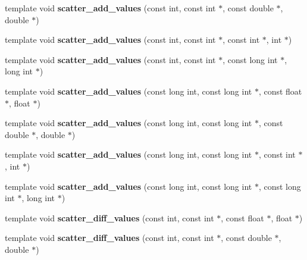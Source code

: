 \begin{DoxyCompactItemize}
\item 
\mbox{\label{namespaceschwz_a1a15b2c2b084f065b99bcae1bd055ca1}} 
template void {\bfseries scatter\+\_\+add\+\_\+values} (const int, const int $\ast$, const double $\ast$, double $\ast$)
\item 
\mbox{\label{namespaceschwz_ac501d1bffab5f31ad4cc9c63ec4bad86}} 
template void {\bfseries scatter\+\_\+add\+\_\+values} (const int, const int $\ast$, const int $\ast$, int $\ast$)
\item 
\mbox{\label{namespaceschwz_adeea7daa5b0f92d1b09e55720fa63bb6}} 
template void {\bfseries scatter\+\_\+add\+\_\+values} (const int, const int $\ast$, const long int $\ast$, long int $\ast$)
\item 
\mbox{\label{namespaceschwz_a08d3a3036763cfa75d455f6b71844cb3}} 
template void {\bfseries scatter\+\_\+add\+\_\+values} (const long int, const long int $\ast$, const float $\ast$, float $\ast$)
\item 
\mbox{\label{namespaceschwz_ac1dc2225592f5f39274b6cf7dd6a5117}} 
template void {\bfseries scatter\+\_\+add\+\_\+values} (const long int, const long int $\ast$, const double $\ast$, double $\ast$)
\item 
\mbox{\label{namespaceschwz_a632ab20939f9053831bf45bf6a426ad8}} 
template void {\bfseries scatter\+\_\+add\+\_\+values} (const long int, const long int $\ast$, const int $\ast$, int $\ast$)
\item 
\mbox{\label{namespaceschwz_a6c2e0122e5402b8f4d92358983aee12e}} 
template void {\bfseries scatter\+\_\+add\+\_\+values} (const long int, const long int $\ast$, const long int $\ast$, long int $\ast$)
\item 
\mbox{\label{namespaceschwz_ad1434310b9a8066f5b4c2addea42ac14}} 
template void {\bfseries scatter\+\_\+diff\+\_\+values} (const int, const int $\ast$, const float $\ast$, float $\ast$)
\item 
\mbox{\label{namespaceschwz_a290715fb4948e0e9b86990bd1944eb70}} 
template void {\bfseries scatter\+\_\+diff\+\_\+values} (const int, const int $\ast$, const double $\ast$, double $\ast$)

\end{DoxyCompactItemize}
